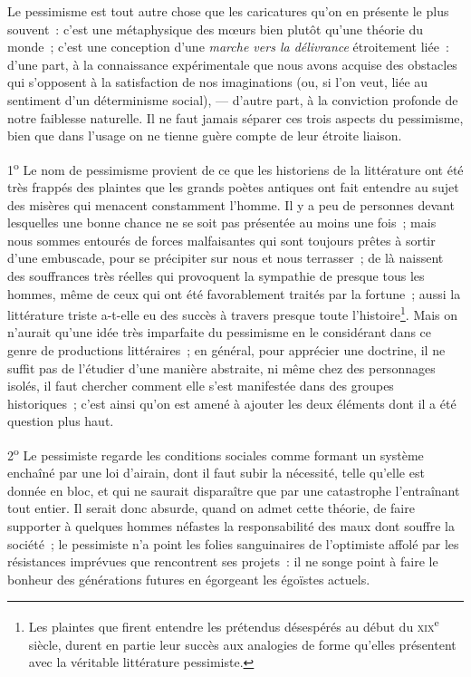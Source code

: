 \documentclass[french,twoside]{book} %
\begin{document}
\noindent Le pessimisme est tout autre chose que les caricatures qu’on en présente le plus souvent : c’est une métaphysique des mœurs bien plutôt qu’une théorie du monde ; c’est une conception d’une \emph{marche vers la délivrance} étroitement liée : d’une part, à la connaissance expérimentale que nous avons acquise des obstacles qui s’opposent à la satisfaction de nos imaginations (ou, si l’on veut, liée au sentiment d’un déterminisme social), — d’autre part, à la conviction profonde de notre faiblesse naturelle. Il ne faut jamais séparer ces trois aspects du pessimisme, bien que dans l’usage on ne tienne guère compte de leur étroite liaison.\par
1\textsuperscript{o} Le nom de pessimisme provient de ce que les historiens  de la littérature ont été très frappés des plaintes que les grands poètes antiques ont fait entendre au sujet des misères qui menacent constamment l’homme. Il y a peu de personnes devant lesquelles une bonne chance ne se soit pas présentée au moins une fois ; mais nous sommes entourés de forces malfaisantes qui sont toujours prêtes à sortir d’une embuscade, pour se précipiter sur nous et nous terrasser ; de là naissent des souffrances très réelles qui provoquent la sympathie de presque tous les hommes, même de ceux qui ont été favorablement traités par la fortune ; aussi la littérature triste a-t-elle eu des succès à travers presque toute l’histoire\footnote{ \noindent Les plaintes que firent entendre les prétendus désespérés au début du {\scshape xix}\textsuperscript{e} siècle, durent en partie leur succès aux analogies de forme qu’elles présentent avec la véritable littérature pessimiste.
 }. Mais on n’aurait qu’une idée très imparfaite du pessimisme en le considérant dans ce genre de productions littéraires ; en général, pour apprécier une doctrine, il ne suffit pas de l’étudier d’une manière abstraite, ni même chez des personnages isolés, il faut chercher comment elle s’est manifestée dans des groupes historiques ; c’est ainsi qu’on est amené à ajouter les deux éléments dont il a été question plus haut.\par
2\textsuperscript{o} Le pessimiste regarde les conditions sociales comme formant un système enchaîné par une loi d’airain, dont il faut subir la nécessité, telle qu’elle est donnée en bloc, et qui ne saurait disparaître que par une catastrophe l’entraînant tout entier. Il serait donc absurde, quand on admet cette théorie, de faire supporter à quelques hommes  néfastes la responsabilité des maux dont souffre la société ; le pessimiste n’a point les folies sanguinaires de l’optimiste affolé par les résistances imprévues que rencontrent ses projets : il ne songe point à faire le bonheur des générations futures en égorgeant les égoïstes actuels.\par
\end{document}
